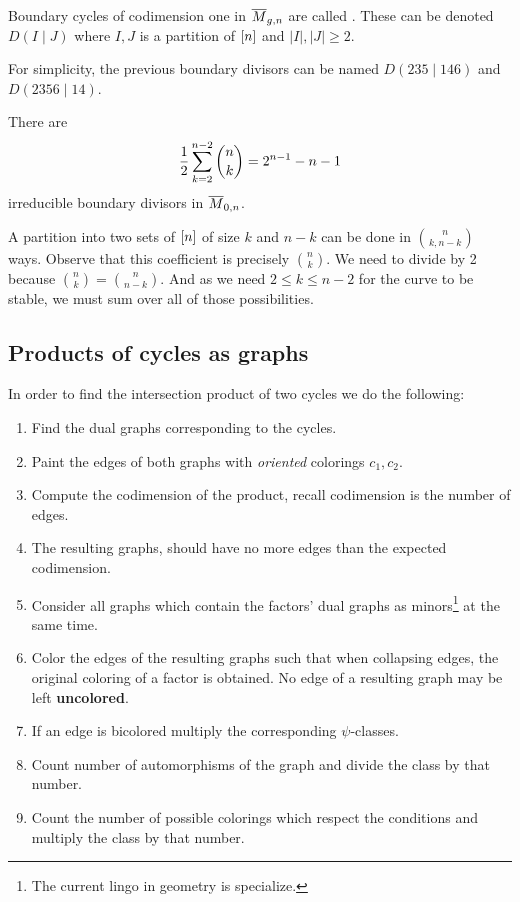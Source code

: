 \documentclass[12pt]{memoir}
\begin{document}
\begin{Def}
    Boundary cycles of codimension one in $\overline M_{g,n}$ are called . These can be denoted $D(I\mid J)$ where $I,J$ is a partition of $\left\lbrack n\right\rbrack$ and $|I|,|J|\geq 2$.
\end{Def}

\begin{Ex}
    For simplicity, the previous boundary divisors can be named $D(235\mid 146)$ and $D(2356\mid 14)$.
\end{Ex}

\begin{Prop}
    There are 
    $$\half\sum_{k=2}^{n-2}\binom{n}{k}=2^{n-1}-n-1$$
    irreducible boundary divisors in $\overline M_{0,n}$.
\end{Prop}

\begin{ptcbp}
    A partition into two sets of $\left\lbrack n\right\rbrack$ of size $k$ and $n-k$ can be done in $\binom{n}{k,n-k}$ ways. Observe that this coefficient is precisely $\binom{n}{k}$. We need to divide by 2 because $\binom{n}{k}=\binom{n}{n-k}$. And as we need $2\leq k\leq n-2$ for the curve to be stable, we must sum over all of those possibilities. 
\end{ptcbp}

\subsection{Products of cycles as graphs}

In order to find the intersection product of two cycles we do the following:

\begin{enumerate}
    \item Find the dual graphs corresponding to the cycles.
    \item Paint the edges of both graphs with \emph{oriented} colorings $c_1,c_2$. 
    \item Compute the codimension of the product, recall codimension is the number of edges.
    \item The resulting graphs, should have no more edges than the expected codimension.
    \item Consider all graphs which contain the factors' dual graphs as minors\footnote{The current lingo in geometry is specialize.} at the same time.
    \item Color the edges of the resulting graphs such that when collapsing edges, the original coloring of a factor is obtained. No edge of a resulting graph may be left \textbf{uncolored}.
    \item If an edge is bicolored multiply the corresponding $\psi$-classes. 
    \item Count number of automorphisms of the graph and divide the class by that number. 
    \item Count the number of possible colorings which respect the conditions and multiply the class by that number.
\end{enumerate}
\end{document}

